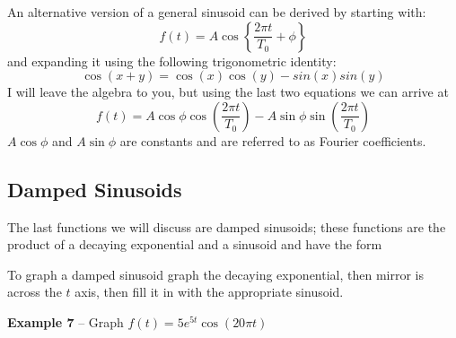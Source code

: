 \documentclass{handout}
\begin{document}
An alternative version of a general sinusoid can be derived by starting with:
\begin{equation}
f(t) =  A\cos\left\{\frac{2\pi t}{T_0}+\phi \right\}
\end{equation}
and expanding it using the following trigonometric identity:
\begin{equation}
\cos(x +y) = \cos(x)\cos(y)-sin(x)sin(y)
\end{equation}
I will leave the algebra to you, but using the last two equations we can arrive at
\begin{equation}
f(t) = A\cos \phi \cos \left(\frac{2\pi t}{T_0}\right)-A \sin \phi \sin \left(\frac{2\pi t}{T_0}\right)
\end{equation}
$A\cos\phi$ and $A\sin\phi$ are constants and are referred to as Fourier coefficients.


\subsection{Damped Sinusoids}
The last functions we will discuss are damped sinusoids; these functions are the product of a decaying exponential and a sinusoid and have the form


To graph a damped sinusoid graph the decaying exponential, then mirror is across the $t$ axis, then fill it in with the appropriate sinusoid.

\textbf{Example 7} -- Graph $f(t) = 5e^{5t}\cos\left(20\pi t  \right)$

\newpage
\clearpage
\pagebreak

\newpage
\clearpage
\pagebreak

\newpage
\clearpage
\pagebreak

\newpage
\clearpage
\pagebreak

\newpage
\clearpage
\pagebreak

\newpage
\clearpage
\pagebreak

\newpage
\clearpage
\pagebreak
\end{document}
